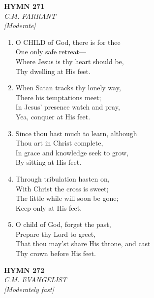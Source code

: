 \documentclass[11pt,a4paper]{article}
\begin{document}
\newpage
\begin{center}
    {\Large \textbf{HYMN 271}}
    \\
    \textit{C.M. FARRANT}
    \\
    \textit{\small [Moderate]}
\end{center}
\vspace{1em}

\begin{enumerate}
    \item O CHILD of God, there is for thee \\
        One only safe retreat--- \\
        Where Jesus is thy heart should be, \\
        Thy dwelling at His feet.

    \item When Satan tracks thy lonely way, \\
        There his temptations meet; \\
        In Jesus' presence watch and pray, \\
        Yea, conquer at His feet.

    \item Since thou hast much to learn, although \\
        Thou art in Christ complete, \\
        In grace and knowledge seek to grow, \\
        By sitting at His feet.

    \item Through tribulation hasten on, \\
        With Christ the cross is sweet; \\
        The little while will soon be gone; \\
        Keep only at His feet.

    \item O child of God, forget the past, \\
        Prepare thy Lord to greet, \\
        That thou may'st share His throne, and cast \\
        Thy crown before His feet.

\end{enumerate}

\newpage
\begin{center}
    {\Large \textbf{HYMN 272}}
    \\
    \textit{C.M. EVANGELIST}
    \\
    \textit{\small [Moderately fast]}
\end{center}
\vspace{1em}
\end{document}
